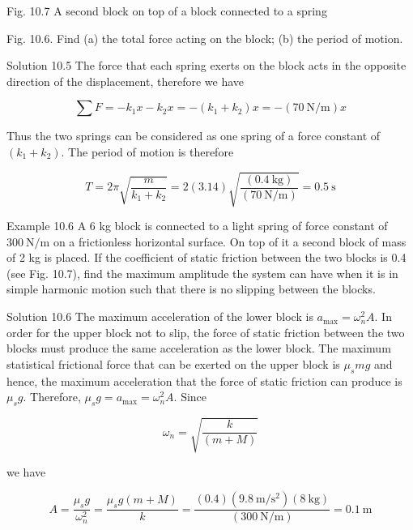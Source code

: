 \documentclass[10pt]{article}
\begin{document}
Fig. 10.7 A second block on top of a block connected to a spring

Fig. 10.6. Find (a) the total force acting on the block; (b) the period of motion.

Solution 10.5 The force that each spring exerts on the block acts in the opposite direction of the displacement, therefore we have

$$
\sum F=-k_{1} x-k_{2} x=-\left(k_{1}+k_{2}\right) x=-(70 \mathrm{~N} / \mathrm{m}) x
$$

Thus the two springs can be considered as one spring of a force constant of $\left(k_{1}+k_{2}\right)$. The period of motion is therefore

$$
T=2 \pi \sqrt{\frac{m}{k_{1}+k_{2}}}=2(3.14) \sqrt{\frac{(0.4 \mathrm{~kg})}{(70 \mathrm{~N} / \mathrm{m})}}=0.5 \mathrm{~s}
$$

Example 10.6 A 6 kg block is connected to a light spring of force constant of $300 \mathrm{~N} / \mathrm{m}$ on a frictionless horizontal surface. On top of it a second block of mass of 2 kg is placed. If the coefficient of static friction between the two blocks is 0.4 (see Fig. 10.7), find the maximum amplitude the system can have when it is in simple harmonic motion such that there is no slipping between the blocks.

Solution 10.6 The maximum acceleration of the lower block is $a_{\max }=\omega_{n}^{2} A$. In order for the upper block not to slip, the force of static friction between the two blocks must produce the same acceleration as the lower block. The maximum statistical frictional force that can be exerted on the upper block is $\mu_{s} m g$ and hence, the maximum acceleration that the force of static friction can produce is $\mu_{s} g$. Therefore, $\mu_{s} g=a_{\max }=\omega_{n}^{2} A$. Since

$$
\omega_{n}=\sqrt{\frac{k}{(m+M)}}
$$

we have

$$
A=\frac{\mu_{s} g}{\omega_{n}^{2}}=\frac{\mu_{s} g(m+M)}{k}=\frac{(0.4)\left(9.8 \mathrm{~m} / \mathrm{s}^{2}\right)(8 \mathrm{~kg})}{(300 \mathrm{~N} / \mathrm{m})}=0.1 \mathrm{~m}
$$
\end{document}
